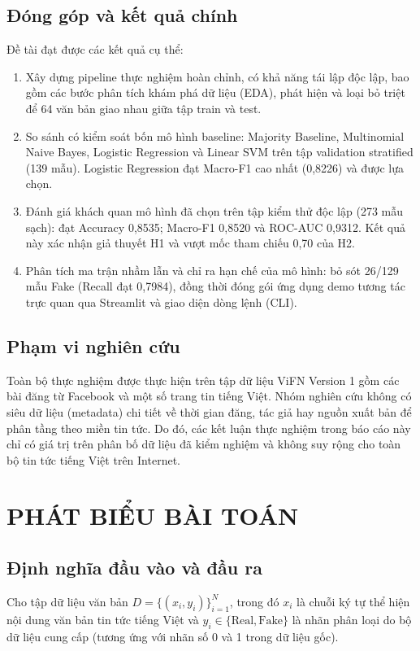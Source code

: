 \documentclass[12pt,a4paper]{report}
\begin{document}
\section{Đóng góp và kết quả chính}
Đề tài đạt được các kết quả cụ thể:
\begin{enumerate}[leftmargin=24pt]
  \item Xây dựng pipeline thực nghiệm hoàn chỉnh, có khả năng tái lập độc lập, bao gồm các bước phân tích khám phá dữ liệu (EDA), phát hiện và loại bỏ triệt để 64 văn bản giao nhau giữa tập train và test.
  \item So sánh có kiểm soát bốn mô hình baseline: Majority Baseline, Multinomial Naive Bayes, Logistic Regression và Linear SVM trên tập validation stratified (139 mẫu). Logistic Regression đạt Macro-F1 cao nhất (0,8226) và được lựa chọn.
  \item Đánh giá khách quan mô hình đã chọn trên tập kiểm thử độc lập (273 mẫu sạch): đạt Accuracy 0,8535; Macro-F1 0,8520 và ROC-AUC 0,9312. Kết quả này xác nhận giả thuyết H1 và vượt mốc tham chiếu 0,70 của H2.
  \item Phân tích ma trận nhầm lẫn và chỉ ra hạn chế của mô hình: bỏ sót 26/129 mẫu Fake (Recall đạt 0,7984), đồng thời đóng gói ứng dụng demo tương tác trực quan qua Streamlit và giao diện dòng lệnh (CLI).
\end{enumerate}

\section{Phạm vi nghiên cứu}
Toàn bộ thực nghiệm được thực hiện trên tập dữ liệu ViFN Version 1 gồm các bài đăng từ Facebook và một số trang tin tiếng Việt. Nhóm nghiên cứu không có siêu dữ liệu (metadata) chi tiết về thời gian đăng, tác giả hay nguồn xuất bản để phân tầng theo miền tin tức. Do đó, các kết luận thực nghiệm trong báo cáo này chỉ có giá trị trên phân bố dữ liệu đã kiểm nghiệm và không suy rộng cho toàn bộ tin tức tiếng Việt trên Internet.

\chapter{PHÁT BIỂU BÀI TOÁN}

\section{Định nghĩa đầu vào và đầu ra}
Cho tập dữ liệu văn bản $D = \{(x_i, y_i)\}_{i=1}^N$, trong đó $x_i$ là chuỗi ký tự thể hiện nội dung văn bản tin tức tiếng Việt và $y_i \in \{\text{Real}, \text{Fake}\}$ là nhãn phân loại do bộ dữ liệu cung cấp (tương ứng với nhãn số 0 và 1 trong dữ liệu gốc).
\end{document}
